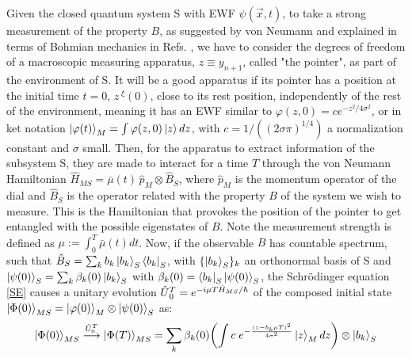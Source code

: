 \documentclass[11pt, a4paper]{article} %
\begin{document}
Given the closed quantum system S with EWF $\psi(\vec{x},t)$, to take a strong measurement of the property $B$, as suggested by von Neumann \cite{vonNeumann} and explained in terms of Bohmian mechanics in Refs. \cite{Durr, JordiXavier, Holland}, we have to consider the degrees of freedom of a macroscopic measuring apparatus, $z\equiv y_{n+1}$, called "the pointer", as part of the environment of S. It will be a good apparatus if its pointer has a position at the initial time $t=0$, $z^{\;\xi}(0)$, close to its rest position, independently of the rest of the environment, meaning it has an EWF similar to $\varphi(z,0)=c e^{-z^2/4\sigma^2}$, or in ket notation $\ket{\varphi(t)}_M=\int\varphi(z,0) \ket{z}dz$, with $c=1/((2\sigma\pi)^{1/4})$ a normalization constant and $\sigma$ small. Then, for the apparatus to extract information of the subsystem S, they are made to interact for a time $T$ through the von Neumann Hamiltonian $\hat{H}_{MS}=\bar{\mu}(t)\,\hat{p}_M\otimes \hat{B}_S$, where $\hat{p}_M$ is the momentum operator of the dial and $\hat{B}_S$ is the operator related with the property $B$ of the system we wish to measure. This is the Hamiltonian that provokes the position of the pointer to get entangled with the possible eigenstates of $B$. Note the measurement strength is defined as $\mu:=\int_0^T\bar{\mu}(t)dt$. Now, if the observable $B$ has countable spectrum, such that $\hat{B}_S=\sum_k b_k \ket{b_k}_S\bra{b_k}_S$, with $\{\ket{b_k}_S\}_k$ an orthonormal basis of S and $\ket{\psi(0)}_S=\sum_k \beta_k(0)\ket{b_k}_S$ with $\beta_k(0)=\bra{b_k}_S\ket{\psi(0)}_S$, the Schrödinger equation \eqref{SE} causes a unitary evolution $\hat{U} \null_{0}^T=e^{-i\mu T \hat{H}_{MS}/\hbar}$ of the composed initial state $\ket{\Phi(0)}_{MS}=\ket{\varphi(0)}_M\otimes\ket{\psi(0)}_S$ as:\vspace{-0.15cm}
\begin{equation}\label{postM1}
\ket{\Phi(0)}_{MS} \overset{\hat{U}_{0}^T}{\longrightarrow} \ket{\Phi(T)}_{MS}=\sum_k \beta_k(0)\qty(\int c \; e^{-\frac{(z-b_k\mu T)^2}{4\sigma^2}}\ket{z}_M dz )\otimes \ket{b_k}_S \vspace{-0.15cm}
\end{equation}
\end{document}
